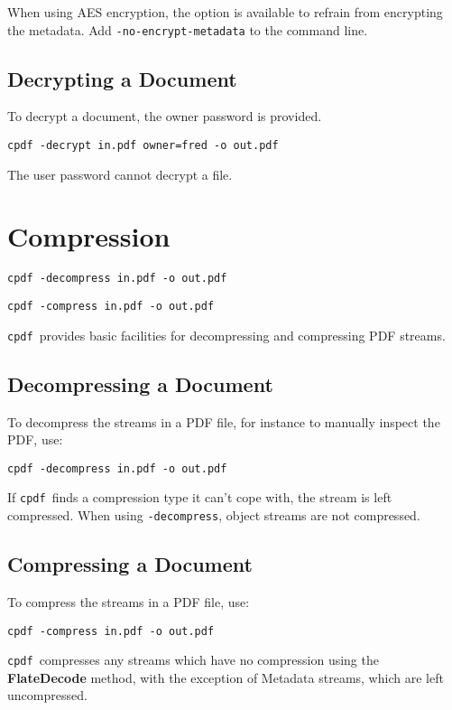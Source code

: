 \documentclass{book}
\newcommand{\cpdf}{\texttt{cpdf}}
\begin{document}
When using AES encryption, the option is available to refrain from encrypting the
metadata. Add \texttt{-no-encrypt-metadata} to the command line.

  \section{Decrypting a Document}
  To decrypt a document, the owner password is provided.
  \begin{framed}
    \small\verb!cpdf -decrypt in.pdf owner=fred -o out.pdf!
  \end{framed}
  \noindent The user password cannot decrypt a file.

\chapter{Compression}
  \begin{framed}
     \small\noindent\verb!cpdf -decompress in.pdf -o out.pdf!

     \vspace{1.5mm}
     \noindent\verb!cpdf -compress in.pdf -o out.pdf!
     
   \end{framed}
  \cpdf\ provides basic facilities for decompressing and compressing PDF streams.
  \section{Decompressing a Document}
  To decompress the streams in a PDF file, for instance to manually inspect the
PDF, use:
  \begin{framed}
   \small\verb!cpdf -decompress in.pdf -o out.pdf!
  \end{framed}
  \noindent If \cpdf\ finds a compression type it can't cope with, the stream is left compressed. When using \texttt{-decompress}, object streams are not compressed.
  \section{Compressing a Document}
  To compress the streams in a PDF file, use:
  \begin{framed}
    \small\verb!cpdf -compress in.pdf -o out.pdf!
  \end{framed}
  \noindent\cpdf\ compresses any streams which have no compression using the
  \textbf{Flate\-Decode} method, with the exception of Metadata streams, which
  are left uncompressed.
  
\end{document}
